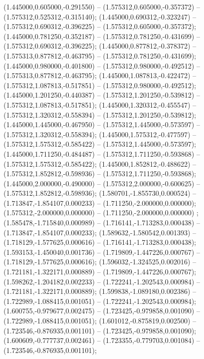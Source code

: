  (1.445000,0.605000,-0.291550) -- (1.575312,0.605000,-0.357372) -- (1.575312,0.525312,-0.315140);
 (1.445000,0.690312,-0.323247) -- (1.575312,0.690312,-0.396225) -- (1.575312,0.605000,-0.357372);
 (1.445000,0.781250,-0.352187) -- (1.575312,0.781250,-0.431699) -- (1.575312,0.690312,-0.396225);
 (1.445000,0.877812,-0.378372) -- (1.575313,0.877812,-0.463795) -- (1.575312,0.781250,-0.431699);
 (1.445000,0.980000,-0.401800) -- (1.575312,0.980000,-0.492512) -- (1.575313,0.877812,-0.463795);
 (1.445000,1.087813,-0.422472) -- (1.575312,1.087813,-0.517851) -- (1.575312,0.980000,-0.492512);
 (1.445000,1.201250,-0.440387) -- (1.575312,1.201250,-0.539812) -- (1.575312,1.087813,-0.517851);
 (1.445000,1.320312,-0.455547) -- (1.575312,1.320312,-0.558394) -- (1.575312,1.201250,-0.539812);
 (1.445000,1.445000,-0.467950) -- (1.575312,1.445000,-0.573597) -- (1.575312,1.320312,-0.558394);
 (1.445000,1.575312,-0.477597) -- (1.575312,1.575312,-0.585422) -- (1.575312,1.445000,-0.573597);
 (1.445000,1.711250,-0.484487) -- (1.575312,1.711250,-0.593868) -- (1.575312,1.575312,-0.585422);
 (1.445000,1.852812,-0.488622) -- (1.575312,1.852812,-0.598936) -- (1.575312,1.711250,-0.593868);
 (1.445000,2.000000,-0.490000) -- (1.575312,2.000000,-0.600625) -- (1.575312,1.852812,-0.598936);
 (1.580701,-1.855730,0.000524) -- (1.713847,-1.854107,0.000233) -- (1.711250,-2.000000,0.000000);
 (1.575312,-2.000000,0.000000) -- (1.711250,-2.000000,0.000000) ;
 (1.585478,-1.715840,0.000989) -- (1.716141,-1.713283,0.000438) -- (1.713847,-1.854107,0.000233);
 (1.589632,-1.580542,0.001393) -- (1.718129,-1.577625,0.000616) -- (1.716141,-1.713283,0.000438);
 (1.593153,-1.450040,0.001736) -- (1.719809,-1.447226,0.000767) -- (1.718129,-1.577625,0.000616);
 (1.596032,-1.324525,0.002016) -- (1.721181,-1.322171,0.000889) -- (1.719809,-1.447226,0.000767);
 (1.598262,-1.204182,0.002233) -- (1.722241,-1.202543,0.000984) -- (1.721181,-1.322171,0.000889);
 (1.599838,-1.089180,0.002386) -- (1.722989,-1.088415,0.001051) -- (1.722241,-1.202543,0.000984);
 (1.600755,-0.979677,0.002475) -- (1.723425,-0.979858,0.001090) -- (1.722989,-1.088415,0.001051);
 (1.601012,-0.875819,0.002500) -- (1.723546,-0.876935,0.001101) -- (1.723425,-0.979858,0.001090);
 (1.600609,-0.777737,0.002461) -- (1.723355,-0.779703,0.001084) -- (1.723546,-0.876935,0.001101);
